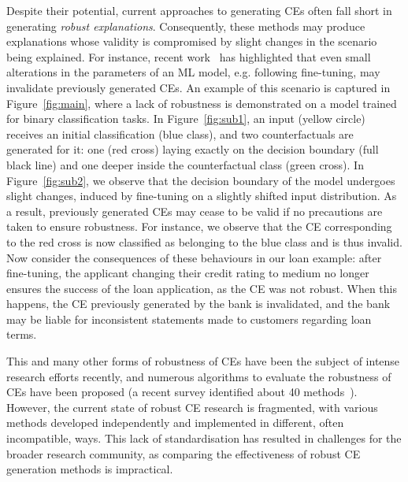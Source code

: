 Despite their potential, current approaches to generating CEs often fall short in generating \emph{robust explanations}. Consequently, these methods may produce explanations whose validity is compromised by slight changes in the scenario being explained. For instance, recent work~\cite{UpadhyayJL21,JiangL0T23,DBLP:conf/icml/HammanNMMD23} has highlighted that even small alterations in the parameters of an ML model, e.g. following fine-tuning, may invalidate previously generated CEs. An example of this scenario is captured in Figure~\ref{fig:main}, where a lack of robustness is demonstrated on a model trained for binary classification tasks. In Figure~\ref{fig:sub1}, an input (yellow circle) receives an initial classification (blue class), and two counterfactuals are generated for it: one (red cross) laying exactly on the decision boundary (full black line) and one deeper inside the counterfactual class (green cross). In Figure~\ref{fig:sub2}, we observe that the decision boundary of the model undergoes slight changes, induced by fine-tuning on a slightly shifted input distribution. As a result, previously generated CEs may cease to be valid if no precautions are taken to ensure robustness. For instance, we observe that the CE corresponding to the red cross is now classified as belonging to the blue class and is thus invalid. Now consider the consequences of these behaviours in our loan example: after fine-tuning, the applicant changing their credit rating to medium no longer ensures the success of the loan application, as the CE was not robust. When this happens, the CE previously generated by the bank is invalidated, and the bank may be liable for inconsistent statements made to customers regarding loan terms.

This and many other forms of robustness of CEs have been the subject of intense research efforts recently, and numerous algorithms to evaluate the robustness of CEs have been proposed (a recent survey identified about 40 methods~\cite{ijcai2024survey}). However, the current state of robust CE research is fragmented, with various methods developed independently and implemented in different, often incompatible, ways. This lack of standardisation has resulted in challenges for the broader research community, as comparing the effectiveness of robust CE generation methods is impractical. 
 
